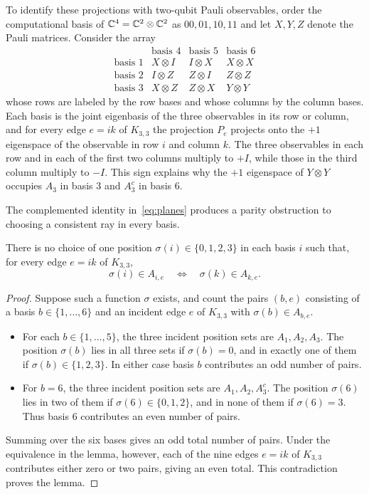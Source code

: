 To identify these projections with two-qubit Pauli observables, order the computational basis of $\mathbb C^4=\mathbb C^2\otimes\mathbb C^2$ as $00,01,10,11$ and let $X,Y,Z$ denote the Pauli matrices. Consider the array
\begin{equation}\label{eq:pauli-square}
\begin{array}{c|ccc}
 &\text{basis }4&\text{basis }5&\text{basis }6\\ \hline
\text{basis }1& X\otimes I& I\otimes X& X\otimes X\\
\text{basis }2& I\otimes Z& Z\otimes I& Z\otimes Z\\
\text{basis }3& X\otimes Z& Z\otimes X& Y\otimes Y
\end{array}
\end{equation}
whose rows are labeled by the row bases and whose columns by the column bases. Each basis is the joint eigenbasis of the three observables in its row or column, and for every edge $e=ik$ of $K_{3,3}$ the projection $P_e$ projects onto the $+1$ eigenspace of the observable in row $i$ and column $k$. The three observables in each row and in each of the first two columns multiply to $+I$, while those in the third column multiply to $-I$. This sign explains why the $+1$ eigenspace of $Y\otimes Y$ occupies $A_3$ in basis $3$ and $A_3^c$ in basis $6$.

The complemented identity in~\eqref{eq:planes} produces a parity obstruction to choosing a consistent ray in every basis.

\begin{lemma}\label{lem:parity}
There is no choice of one position $\sigma(i)\in\{0,1,2,3\}$ in each basis $i$ such that, for every edge $e=ik$ of $K_{3,3}$,
\[
 \sigma(i)\in A_{i,e}\quad\Longleftrightarrow\quad \sigma(k)\in A_{k,e}.
\]
\end{lemma}
\begin{proof}
Suppose such a function $\sigma$ exists, and count the pairs $(b,e)$ consisting of a basis $b\in\{1,\ldots,6\}$ and an incident edge $e$ of $K_{3,3}$ with $\sigma(b)\in A_{b,e}$.
\begin{itemize}
\item For each $b\in\{1,\ldots,5\}$, the three incident position sets are $A_1,A_2,A_3$. The position $\sigma(b)$ lies in all three sets if $\sigma(b)=0$, and in exactly one of them if $\sigma(b)\in\{1,2,3\}$. In either case basis $b$ contributes an odd number of pairs.
\item For $b=6$, the three incident position sets are $A_1,A_2,A_3^c$. The position $\sigma(6)$ lies in two of them if $\sigma(6)\in\{0,1,2\}$, and in none of them if $\sigma(6)=3$. Thus basis $6$ contributes an even number of pairs.
\end{itemize}
Summing over the six bases gives an odd total number of pairs. Under the equivalence in the lemma, however, each of the nine edges $e=ik$ of $K_{3,3}$ contributes either zero or two pairs, giving an even total. This contradiction proves the lemma.
\end{proof}

